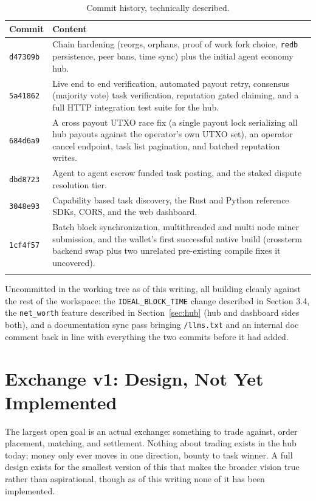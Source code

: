 \documentclass[11pt]{article}
\newcommand{\code}[1]{\texttt{#1}}
\begin{document}
\begin{longtable}{@{}p{2.1cm}p{10.7cm}@{}}
\toprule
\textbf{Commit} & \textbf{Content} \\
\midrule
\endhead
\code{d47309b} & Chain hardening (reorgs, orphans, proof of work fork choice, \code{redb} persistence, peer bans, time sync) plus the initial agent economy hub. \\
\code{5a41862} & Live end to end verification, automated payout retry, consensus (majority vote) task verification, reputation gated claiming, and a full HTTP integration test suite for the hub. \\
\code{684d6a9} & A cross payout UTXO race fix (a single payout lock serializing all hub payouts against the operator's own UTXO set), an operator cancel endpoint, task list pagination, and batched reputation writes. \\
\code{dbd8723} & Agent to agent escrow funded task posting, and the staked dispute resolution tier. \\
\code{3048e93} & Capability based task discovery, the Rust and Python reference SDKs, CORS, and the web dashboard. \\
\code{1cf4f57} & Batch block synchronization, multithreaded and multi node miner submission, and the wallet's first successful native build (crossterm backend swap plus two unrelated pre-existing compile fixes it uncovered). \\
\bottomrule
\caption{Commit history, technically described.}
\label{tab:commits}
\end{longtable}

Uncommitted in the working tree as of this writing, all building cleanly against the rest of the workspace: the \code{IDEAL\_BLOCK\_TIME} change described in Section 3.4, the \code{net\_worth} feature described in Section~\ref{sec:hub} (hub and dashboard sides both), and a documentation sync pass bringing \code{/llms.txt} and an internal doc comment back in line with everything the two commits before it had added.

\section{Exchange v1: Design, Not Yet Implemented}
\label{sec:exchange}

The largest open goal is an actual exchange: something to trade against, order placement, matching, and settlement. Nothing about trading exists in the hub today; money only ever moves in one direction, bounty to task winner. A full design exists for the smallest version of this that makes the broader vision true rather than aspirational, though as of this writing none of it has been implemented.
\end{document}
